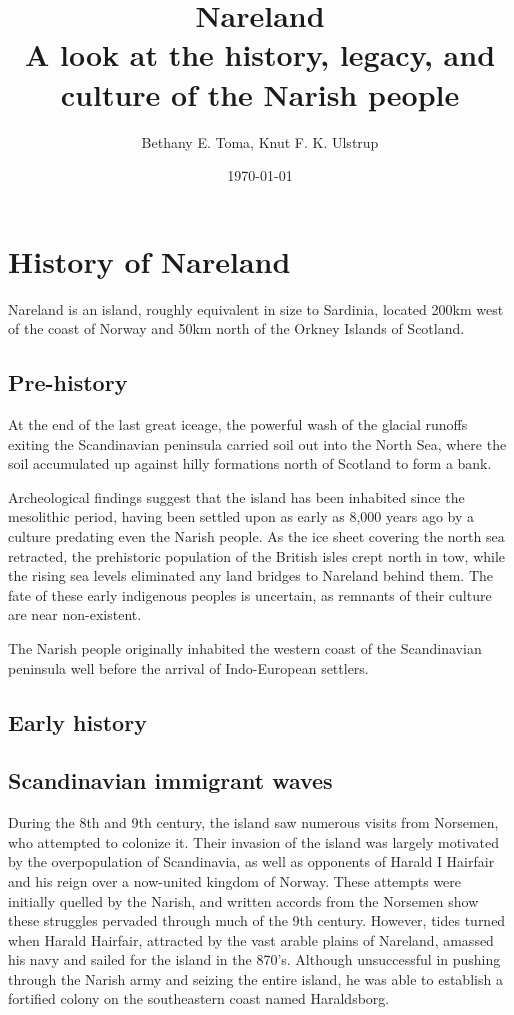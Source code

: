 \documentclass[a4paper,11pt,twoside,openright]{memoir}
\title{{\fontsize{100}{100}\selectfont Nareland} \\ \Huge \sffamily A look at the history, legacy, and culture of the Narish people}
\author{Bethany E. Toma, Knut F. K. Ulstrup}
\date{\today}
\begin{document}
\maketitle

\part{History of Nareland}

Nareland is an island, roughly equivalent in size to Sardinia, located 200km west of the coast of Norway and 50km north of the Orkney Islands of Scotland.

\chapter{Pre-history}

At the end of the last great iceage, the powerful wash of the glacial runoffs exiting the Scandinavian peninsula carried soil out into the North Sea, where the soil accumulated up against hilly formations north of Scotland to form a bank.

Archeological findings suggest that the island has been inhabited since the mesolithic period, having been settled upon as early as 8,000 years ago by a culture predating even the Narish people. As the ice sheet covering the north sea retracted, the prehistoric population of the British isles crept north in tow, while the rising sea levels eliminated any land bridges to Nareland behind them. The fate of these early indigenous peoples is uncertain, as remnants of their culture are near non-existent.

The Narish people originally inhabited the western coast of the Scandinavian peninsula well before the arrival of Indo-European settlers. 

\chapter{Early history}



\chapter{Scandinavian immigrant waves}

During the 8th and 9th century, the island saw numerous visits from Norsemen, who attempted to colonize it. Their invasion of the island was largely motivated by the overpopulation of Scandinavia, as well as opponents of Harald I Hairfair and his reign over a now-united kingdom of Norway. These attempts were initially quelled by the Narish, and written accords from the Norsemen show these struggles pervaded through much of the 9th century. However, tides turned when Harald Hairfair, attracted by the vast arable plains of Nareland, amassed his navy and sailed for the island in the 870's. Although unsuccessful in pushing through the Narish army and seizing the entire island, he was able to establish a fortified colony on the southeastern coast named Haraldsborg.
\end{document}
